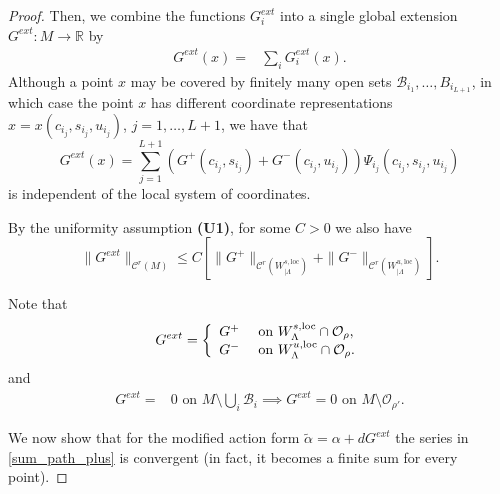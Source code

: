 \documentclass[11pt]{amsart}
\theoremstyle{definition}
\theoremstyle{remark}
\numberwithin{equation}{section}
\newcommand{\B}{\mathcal{B}}
\newcommand{\C}{\mathcal{C}}
\newcommand{\OO}{\mathcal{O}}
\begin{document}
\begin{proof}
Then,  we combine the  functions $G^{ext}_i$ into a single global extension $G^{ext}:M\to \mathbb{R}$ by
\begin{equation}\label{eqn:Gext_def}
\begin{split}
G^{ext}(x)=&\sum_i G^{ext}_i(x).
\end{split}
\end{equation}
Although  a point $x$ may be covered by finitely many open sets $\B_{i_1},\ldots, B_{i_{L+1}}$, in which case the point $x$ has different
coordinate representations
$x=x(c_{i_j},s_{i_j},u_{i_j})$, $j=1,\ldots,L+1$,
we have that
\[G^{ext}(x)= \sum_{j=1}^{L+1} (G^+(c_{i_j},s_{i_j})+G^-(c_{i_j},u_{i_j}))\Psi_{i_j}(c_{i_j},s_{i_j},u_{i_j})\]
is independent of the local system of coordinates.

By the uniformity assumption {\bf (U1)}, for some $C>0$ we also have
\[
\|G^{ext}\|_{\C^r(M)}\le C \left[\|G^+\|_{\C^r(W^{s,\mathrm{loc}}_{\mid \Lambda})} + \|G^-\|_{\C^r(W^{u,\mathrm{loc}}_{\mid \Lambda})}\right].
\]

Note that
\begin{equation}\label{eqn:Gext1}
G^{ext} =
\left\{
\begin{array}{ll}
           G^+  & \hbox{ on $W^{s,\mathrm{loc}}_{ \Lambda} \cap \OO_\rho$},\\
           G^- & \hbox{ on $ W^{u,\mathrm{loc}}_{ \Lambda} \cap \OO_\rho$}.
\end{array}
\right.
\end{equation}
and
\begin{equation}\label{eqn:Gext2}
\begin{split}
G^{ext} =   & 0  \textrm{ on } M\setminus \bigcup_{i} \B_i \implies G^{ext} =    0  \textrm{ on }M\setminus \OO_{\rho'}.
\end{split}
\end{equation}

We now show that for the modified action form $\tilde\alpha=\alpha+dG^{ext}$ the series in \eqref{sum_path_plus} is convergent (in fact, it becomes a finite sum for every point).


\end{proof}
\end{document}
